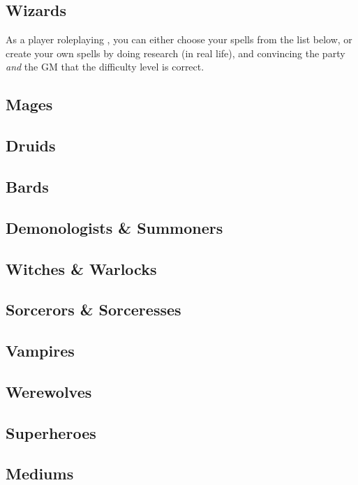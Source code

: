 \documentclass{LegrandOrangeTufteBook}
\begin{document}
\subsection*{Wizards}

As a player roleplaying , you can either choose your spells from the list below,
or create your own spells by doing research (in real life), and convincing the party \emph{and} the GM
that the difficulty level is correct.

\subsection*{Mages}

\subsection*{Druids}

\subsection*{Bards}

\subsection*{Demonologists \& Summoners}

\subsection*{Witches \& Warlocks}

\subsection*{Sorcerors \& Sorceresses}

\subsection*{Vampires}

\subsection*{Werewolves}

\subsection*{Superheroes}

\subsection*{Mediums}
\end{document}
